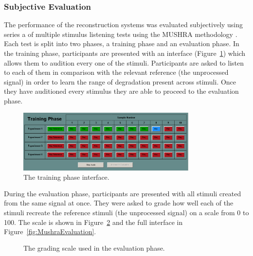 		\subsubsection*{Subjective Evaluation}
			The performance of the reconstruction systems was evaluated subjectively using series a of multiple
			stimulus listening tests using the MUSHRA methodology \citep{mushra2014}. Each test is split into
			two phases, a training phase and an evaluation phase. In the training phase, participants are
			presented with an interface (Figure~\ref{fig:MushraTraining}) which allows them to audition every
			one of the stimuli. Participants are asked to listen to each of them in comparison with the
			relevant reference (the unprocessed signal) in order to learn the range of degradation present
			across stimuli. Once they have auditioned every stimulus they are able to proceed to the evaluation
			phase.

			\begin{figure}[h!]
				\centering
				\includegraphics[width=0.8\textwidth]{chapter7/Images/MushraTraining.png}
				\caption{The training phase interface.}
				\label{fig:MushraTraining}
			\end{figure}

			During the evaluation phase, participants are presented with all stimuli created from the same
			signal at once. They were asked to grade how well each of the stimuli recreate the reference
			stimuli (the unprocessed signal) on a scale from 0 to 100. The scale is shown in
			Figure~\ref{fig:MushraScale} and the full interface in Figure~\ref{fig:MushraEvaluation}.

			\begin{figure}[h!]
				\centering
				\caption{The grading scale used in the evaluation phase.}
				\label{fig:MushraScale}
			\end{figure}

